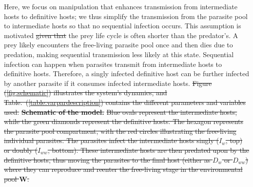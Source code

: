 \documentclass[a4paper]{scrartcl}
\providecommand{\DIFaddtex}[1]{{\protect\color{blue}\uwave{#1}}} %
\providecommand{\DIFdeltex}[1]{{\protect\color{red}\sout{#1}}}                      %
\providecommand{\DIFaddbegin}{} %
\providecommand{\DIFaddend}{} %
\providecommand{\DIFdelbegin}{} %
\providecommand{\DIFdelend}{} %
\providecommand{\DIFdelFL}[1]{\DIFdel{#1}} %
\providecommand{\DIFadd}[1]{\texorpdfstring{\DIFaddtex{#1}}{#1}} %
\providecommand{\DIFdel}[1]{\texorpdfstring{\DIFdeltex{#1}}{}} %
\newcommand{\DIFscaledelfig}{0.5}
\newlength{\DIFdelgraphicswidth} %
\newlength{\DIFdelgraphicsheight} %
\newcommand{\DIFaddincludegraphics}[2][]{{\color{blue}\fbox{\DIFOincludegraphics[#1]{#2}}}} %
\newcommand{\DIFdelincludegraphics}[2][]{%
\sbox{\DIFdelgraphicsbox}{\DIFOincludegraphics[#1]{#2}}%
\settoboxwidth{\DIFdelgraphicswidth}{\DIFdelgraphicsbox} %
\settoboxtotalheight{\DIFdelgraphicsheight}{\DIFdelgraphicsbox} %
\scalebox{\DIFscaledelfig}{%
\parbox[b]{\DIFdelgraphicswidth}{\usebox{\DIFdelgraphicsbox}\\[-\baselineskip] \rule{\DIFdelgraphicswidth}{0em}}\llap{\resizebox{\DIFdelgraphicswidth}{\DIFdelgraphicsheight}{%
\setlength{\unitlength}{\DIFdelgraphicswidth}%
\begin{picture}(1,1)%
\thicklines\linethickness{2pt} %
{\color[rgb]{1,0,0}\put(0,0){\framebox(1,1){}}}%
{\color[rgb]{1,0,0}\put(0,0){\line( 1,1){1}}}%
{\color[rgb]{1,0,0}\put(0,1){\line(1,-1){1}}}%
\end{picture}%
}\hspace*{3pt}}} %
} %
\DeclareRobustCommand{\DIFaddbegin}{\DIFOaddbegin \let\includegraphics\DIFaddincludegraphics} %
\DeclareRobustCommand{\DIFaddend}{\DIFOaddend \let\includegraphics\DIFOincludegraphics} %
\DeclareRobustCommand{\DIFdelbegin}{\DIFOdelbegin \let\includegraphics\DIFdelincludegraphics} %
\DeclareRobustCommand{\DIFdelend}{\DIFOaddend \let\includegraphics\DIFOincludegraphics} %
\begin{document}
Here, we focus on manipulation that enhances transmission from intermediate hosts to definitive hosts; we thus simplify the transmission from the parasite pool to intermediate hosts so that no sequential infection occurs. 
This assumption is motivated \DIFdelbegin \DIFdel{given that }\DIFdelend \DIFaddbegin \DIFadd{because }\DIFaddend the prey life cycle is often shorter than the predator's. 
A prey likely encounters the free-living parasite pool once and then dies due to predation, making sequential transmission less likely at this state.
Sequential infection can happen when parasites transmit from intermediate hosts to definitive hosts. 
Therefore, a singly infected definitive host can be further infected by another parasite if it consumes infected intermediate hosts. 
\DIFdelbegin \DIFdel{Figure (\ref{fig:schematic}) illustrates the system's dynamics, and Table.~(\ref{table:varpardescription}) contains the different parameters and variables used.
}\DIFdelend %
\DIFdelbegin %
{%
\textbf{\DIFdelFL{Schematic of the model.}} 
\DIFdelFL{Blue ovals represent the intermediate hosts, while the green diamonds represent the definitive hosts.
The hexagon represents the parasite pool compartment, with the red circles illustrating the free-living individual parasites.
The parasites infect the intermediate hosts singly ($I_w$, top) or doubly ($I_{ww}$, bottom).
These intermediate hosts are then predated upon by the definitive hosts, thus moving the parasites to the final host (either as $D_w$ or $D_{ww}$) where they can reproduce and reenter the free-living stage in the environmental pool $\mathbf{W}$.
}}
\DIFdelend 
\end{document}

